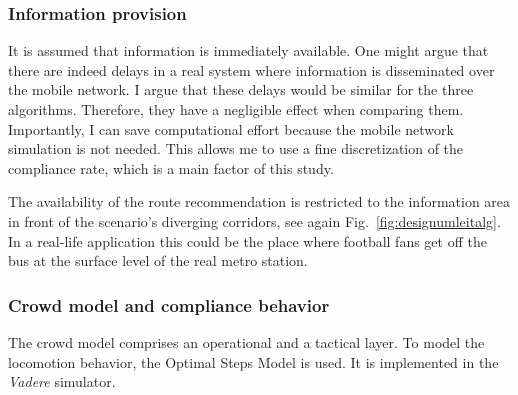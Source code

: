 \subsubsection{Information provision}
It is assumed that information is immediately available. One might argue that there are indeed delays in a real system  where information is disseminated over the mobile network. I argue that these delays would be similar for the three algorithms. Therefore, they have a negligible effect when comparing them. Importantly, I can save computational effort because the mobile network simulation is not needed. This allows me to use a fine discretization of the compliance rate, which is a main factor of this study.

The availability of the route recommendation is restricted to the information area in front of the scenario’s diverging corridors, see again Fig.~\ref{fig:designumleitalg}. In a real-life application this could be the place where football fans get off the bus at the surface level of the real metro station. 




\subsubsection{Crowd model and compliance behavior}
The crowd model comprises an operational and a tactical layer. To model the locomotion behavior, the Optimal Steps Model is used. It is implemented in the \textit{Vadere} simulator.

